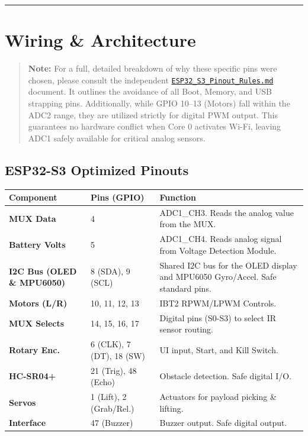 \documentclass[12pt,a4paper]{article}
\begin{document}
\vspace{1em}
\hrule
\vspace{1em}

\section{Wiring \& Architecture}

\begin{quote}
\textbf{Note:} For a full, detailed breakdown of why these specific pins were chosen, please consult the independent \href{run:ESP32_S3_Pinout_Rules.md}{\texttt{ESP32\_S3\_Pinout\_Rules.md}} document. It outlines the avoidance of all Boot, Memory, and USB strapping pins.
Additionally, while GPIO 10--13 (Motors) fall within the ADC2 range, they are utilized strictly for digital PWM output. This guarantees no hardware conflict when Core 0 activates Wi-Fi, leaving ADC1 safely available for critical analog sensors.
\end{quote}

\subsection*{ESP32-S3 Optimized Pinouts}
\begin{table}[ht]
\centering
\small
\begin{tabularx}{\textwidth}{@{}llX@{}}
\toprule
\textbf{Component} & \textbf{Pins (GPIO)} & \textbf{Function} \\ \midrule
\textbf{MUX Data} & 4 & ADC1\_CH3. Reads the analog value from the MUX. \\
\textbf{Battery Volts} & 5 & ADC1\_CH4. Reads analog signal from Voltage Detection Module. \\
\textbf{I2C Bus (OLED \& MPU6050)} & 8 (SDA), 9 (SCL) & Shared I2C bus for the OLED display and MPU6050 Gyro/Accel. Safe standard pins. \\
\textbf{Motors (L/R)} & 10, 11, 12, 13 & IBT2 RPWM/LPWM Controls. \\
\textbf{MUX Selects} & 14, 15, 16, 17 & Digital pins (S0-S3) to select IR sensor routing. \\
\textbf{Rotary Enc.} & 6 (CLK), 7 (DT), 18 (SW)& UI input, Start, and Kill Switch. \\
\textbf{HC-SR04+} & 21 (Trig), 48 (Echo)& Obstacle detection. Safe digital I/O. \\
\textbf{Servos} & 1 (Lift), 2 (Grab/Rel.)& Actuators for payload picking \& lifting. \\
\textbf{Interface} & 47 (Buzzer) & Buzzer output. Safe digital output. \\ \bottomrule
\end{tabularx}
\end{table}
\end{document}

